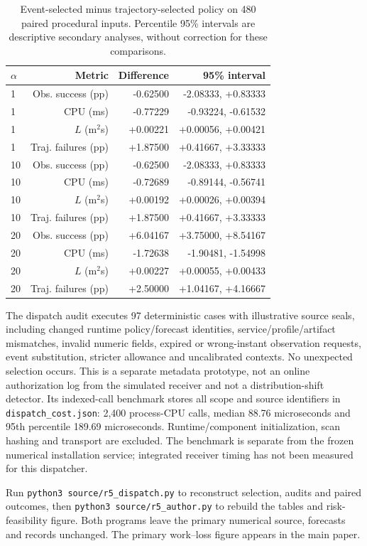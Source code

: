 \begin{table}[!htbp]\centering\footnotesize
\caption{Event-selected minus trajectory-selected policy on 480 paired procedural inputs. Percentile 95\% intervals are descriptive secondary analyses, without correction for these comparisons.}\label{supp:dispatcheffects}
\begin{tabular}{@{}lrrr@{}}\toprule
$\alpha$ & Metric & Difference & 95\% interval\\\midrule
1 & Obs. success (pp) & -0.62500 & -2.08333, +0.83333\\
1 & CPU (ms) & -0.77229 & -0.93224, -0.61532\\
1 & $L$ (m$^2$s) & +0.00221 & +0.00056, +0.00421\\
1 & Traj. failures (pp) & +1.87500 & +0.41667, +3.33333\\
10 & Obs. success (pp) & -0.62500 & -2.08333, +0.83333\\
10 & CPU (ms) & -0.72689 & -0.89144, -0.56741\\
10 & $L$ (m$^2$s) & +0.00192 & +0.00026, +0.00394\\
10 & Traj. failures (pp) & +1.87500 & +0.41667, +3.33333\\
20 & Obs. success (pp) & +6.04167 & +3.75000, +8.54167\\
20 & CPU (ms) & -1.72638 & -1.90481, -1.54998\\
20 & $L$ (m$^2$s) & +0.00227 & +0.00055, +0.00433\\
20 & Traj. failures (pp) & +2.50000 & +1.04167, +4.16667\\
\bottomrule\end{tabular}\end{table}

The dispatch audit executes 97 deterministic cases with illustrative source seals, including changed runtime policy/forecast identities, service/profile/artifact mismatches, invalid numeric fields, expired or wrong-instant observation requests, event substitution, stricter allowance and uncalibrated contexts. No unexpected selection occurs. This is a separate metadata prototype, not an online authorization log from the simulated receiver and not a distribution-shift detector. Its indexed-call benchmark stores all scope and source identifiers in \texttt{dispatch\_cost.json}: 2,400 process-CPU calls, median 88.76 microseconds and 95th percentile 189.69 microseconds. Runtime/component initialization, scan hashing and transport are excluded. The benchmark is separate from the frozen numerical installation service; integrated receiver timing has not been measured for this dispatcher.

Run \texttt{python3 source/r5\_dispatch.py} to reconstruct selection, audits and paired outcomes, then \texttt{python3 source/r5\_author.py} to rebuild the tables and risk-feasibility figure. Both programs leave the primary numerical source, forecasts and records unchanged. The primary work--loss figure appears in the main paper.

